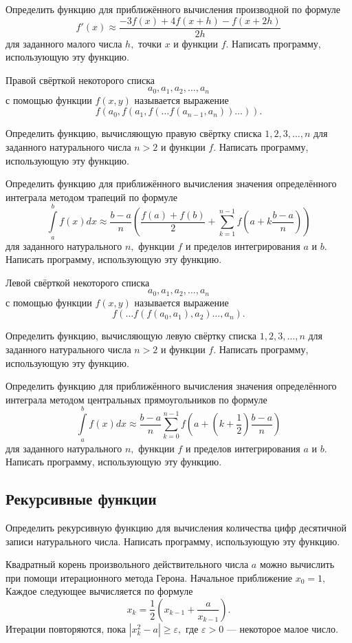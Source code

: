 \task Определить функцию для приближённого вычисления производной по
формуле
\[
f'(x) \approx \frac{-3f(x) + 4f(x+h) - f(x+2h)}{2h}
\]
для заданного малого числа $h,$ точки $x$ и функции $f.$ Написать
программу, использующую эту функцию.

\task Правой свёрткой некоторого списка
\[
a_0, a_1, a_2, \ldots, a_n
\]
с помощью функции $f(x, y)$ называется выражение
\[
f(a_0, f(a_1, f(\ldots f(a_{n-1}, a_n)) \ldots)). 
\]

Определить функцию, вычисляющую правую свёртку списка $1, 2, 3,
\ldots, n$ для заданного натурального числа $n > 2$ и функции
$f$. Написать программу, использующую эту функцию.

\task Определить функцию для приближённого вычисления значения
определённого интеграла методом трапеций по формуле
\[
\int\limits_a^b f(x) dx \approx
\frac{b-a}{n}\left(
\frac{f(a)+f(b)}2 + \sum_{k=1}^{n-1} f \left(a + k\frac{b-a}{n}\right)
\right)
\]
для заданного натурального $n,$ функции $f$ и пределов интегрирования
$a$ и $b.$ Написать программу, использующую эту функцию.

\task Левой свёрткой некоторого списка
\[
a_0, a_1, a_2, \ldots, a_n
\]
с помощью функции $f(x, y)$ называется выражение
\[
f(\ldots f(f(a_0, a_1), a_2) \ldots, a_n). 
\]

Определить функцию, вычисляющую левую свёртку списка $1, 2, 3, \ldots,
n$ для заданного натурального числа $n > 2$ и функции $f.$ Написать
программу, использующую эту функцию.

\task Определить функцию для приближённого вычисления значения
определённого интеграла методом центральных прямоугольников по формуле
\[
\int\limits_a^b f(x) dx \approx
\frac{b-a}{n}\sum_{k=0}^{n-1} f \left(
a + \left(k+\frac{1}{2}\right)\frac{b-a}{n}
\right)
\]
для заданного натурального $n,$ функции $f$ и пределов интегрирования
$a$ и $b.$ Написать программу, использующую эту функцию.


\subsection{Рекурсивные функции}

\task Определить рекурсивную функцию для вычисления количества цифр
десятичной записи натурального числа. Написать программу, использующую
эту функцию.

\task Квадратный корень произвольного действительного числа $a$ можно
вычислить при помощи итерационного метода Герона. Начальное
приближение $x_0 = 1,$ Каждое следующее вычисляется по формуле
\[
x_k = \frac12 \left( x_{k-1} + \frac{a}{x_{k-1}} \right).
\]
Итерации повторяются, пока $\left| x_k^2 - a \right| \geqslant
\varepsilon,$ где $\varepsilon > 0$ — некоторое малое число.

